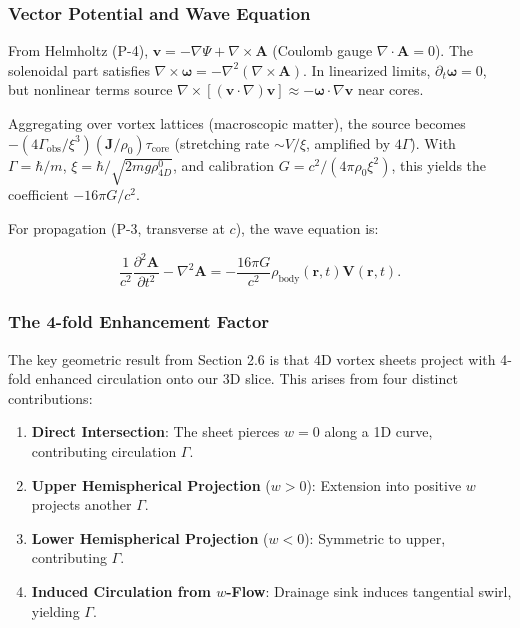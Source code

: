 \documentclass{article}
\begin{document}
\subsubsection{Vector Potential and Wave Equation}

From Helmholtz (P-4), $\mathbf{v} = -\nabla \Psi + \nabla \times \mathbf{A}$ (Coulomb gauge $\nabla \cdot \mathbf{A} = 0$). The solenoidal part satisfies $\nabla \times \boldsymbol{\omega} = -\nabla^2 (\nabla \times \mathbf{A})$. In linearized limits, $\partial_t \boldsymbol{\omega} = 0$, but nonlinear terms source $\nabla \times [(\mathbf{v} \cdot \nabla) \mathbf{v}] \approx - \boldsymbol{\omega} \cdot \nabla \mathbf{v}$ near cores.

Aggregating over vortex lattices (macroscopic matter), the source becomes $- (4\Gamma_{\text{obs}} / \xi^3) (\mathbf{J} / \rho_0) \tau_{\text{core}}$ (stretching rate $\sim V / \xi$, amplified by $4\Gamma$). With $\Gamma = \hbar / m$, $\xi = \hbar / \sqrt{2 m g \rho_{4D}^0}$, and calibration $G = c^2 / (4\pi \rho_0 \xi^2)$, this yields the coefficient $-16\pi G / c^2$.

For propagation (P-3, transverse at $c$), the wave equation is:

\[
\frac{1}{c^2} \frac{\partial^2 \mathbf{A}}{\partial t^2} - \nabla^2 \mathbf{A} = -\frac{16\pi G}{c^2} \rho_{\text{body}}(\mathbf{r}, t) \mathbf{V}(\mathbf{r}, t).
\]

\subsubsection{The 4-fold Enhancement Factor}

The key geometric result from Section 2.6 is that 4D vortex sheets project with 4-fold enhanced circulation onto our 3D slice. This arises from four distinct contributions:

\begin{enumerate}
    \item \textbf{Direct Intersection}: The sheet pierces $w=0$ along a 1D curve, contributing circulation $\Gamma$.
    \item \textbf{Upper Hemispherical Projection} ($w > 0$): Extension into positive $w$ projects another $\Gamma$.
    \item \textbf{Lower Hemispherical Projection} ($w < 0$): Symmetric to upper, contributing $\Gamma$.
    \item \textbf{Induced Circulation from $w$-Flow}: Drainage sink induces tangential swirl, yielding $\Gamma$.
\end{enumerate}
\end{document}
